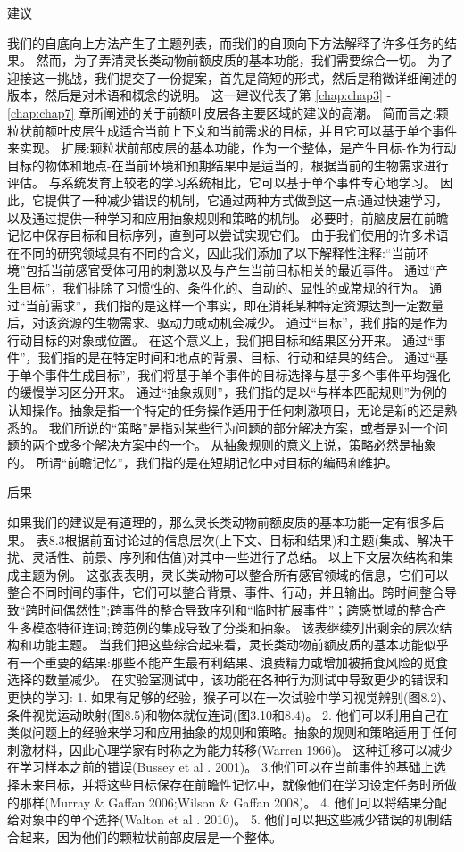 建议

我们的自底向上方法产生了主题列表，而我们的自顶向下方法解释了许多任务的结果。
然而，为了弄清灵长类动物前额皮质的基本功能，我们需要综合一切。
为了迎接这一挑战，我们提交了一份提案，首先是简短的形式，然后是稍微详细阐述的版本，然后是对术语和概念的说明。
这一建议代表了第 \ref{chap:chap3} - \ref{chap:chap7} 章所阐述的关于前额叶皮层各主要区域的建议的高潮。
简而言之:颗粒状前额叶皮层生成适合当前上下文和当前需求的目标，并且它可以基于单个事件来实现。
扩展:颗粒状前部皮层的基本功能，作为一个整体，是产生目标-作为行动目标的物体和地点-在当前环境和预期结果中是适当的，根据当前的生物需求进行评估。
与系统发育上较老的学习系统相比，它可以基于单个事件专心地学习。
因此，它提供了一种减少错误的机制，它通过两种方式做到这一点:通过快速学习，以及通过提供一种学习和应用抽象规则和策略的机制。
必要时，前脑皮层在前瞻记忆中保存目标和目标序列，直到可以尝试实现它们。
由于我们使用的许多术语在不同的研究领域具有不同的含义，因此我们添加了以下解释性注释:“当前环境”包括当前感官受体可用的刺激以及与产生当前目标相关的最近事件。
通过“产生目标”，我们排除了习惯性的、条件化的、自动的、显性的或常规的行为。
通过“当前需求”，我们指的是这样一个事实，即在消耗某种特定资源达到一定数量后，对该资源的生物需求、驱动力或动机会减少。
通过“目标”，我们指的是作为行动目标的对象或位置。
在这个意义上，我们把目标和结果区分开来。
通过“事件”，我们指的是在特定时间和地点的背景、目标、行动和结果的结合。
通过“基于单个事件生成目标”，我们将基于单个事件的目标选择与基于多个事件平均强化的缓慢学习区分开来。
通过“抽象规则”，我们指的是以“与样本匹配规则”为例的认知操作。抽象是指一个特定的任务操作适用于任何刺激项目，无论是新的还是熟悉的。
我们所说的“策略”是指对某些行为问题的部分解决方案，或者是对一个问题的两个或多个解决方案中的一个。
从抽象规则的意义上说，策略必然是抽象的。
所谓“前瞻记忆”，我们指的是在短期记忆中对目标的编码和维护。



后果

如果我们的建议是有道理的，那么灵长类动物前额皮质的基本功能一定有很多后果。
表8.3根据前面讨论过的信息层次(上下文、目标和结果)和主题(集成、解决干扰、灵活性、前景、序列和估值)对其中一些进行了总结。
以上下文层次结构和集成主题为例。
这张表表明，灵长类动物可以整合所有感官领域的信息，它们可以整合不同时间的事件，它们可以整合背景、事件、行动，并且输出。跨时间整合导致“跨时间偶然性”;跨事件的整合导致序列和“临时扩展事件”；跨感觉域的整合产生多模态特征连词;跨范例的集成导致了分类和抽象。
该表继续列出剩余的层次结构和功能主题。
当我们把这些综合起来看，灵长类动物前额皮质的基本功能似乎有一个重要的结果:那些不能产生最有利结果、浪费精力或增加被捕食风险的觅食选择的数量减少。
在实验室测试中，该功能在各种行为测试中导致更少的错误和更快的学习:
1. 如果有足够的经验，猴子可以在一次试验中学习视觉辨别(图8.2)、条件视觉运动映射(图8.5)和物体就位连词(图3.10和8.4)。
2. 他们可以利用自己在类似问题上的经验来学习和应用抽象的规则和策略。抽象的规则和策略适用于任何刺激材料，因此心理学家有时称之为能力转移(Warren 1966)。
这种迁移可以减少在学习样本之前的错误(Bussey et al . 2001)。
3.他们可以在当前事件的基础上选择未来目标，并将这些目标保存在前瞻性记忆中，就像他们在学习设定任务时所做的那样(Murray \& Gaffan 2006;Wilson \& Gaffan 2008)。
4. 他们可以将结果分配给对象中的单个选择(Walton et al . 2010)。
5. 他们可以把这些减少错误的机制结合起来，因为他们的颗粒状前部皮层是一个整体。



